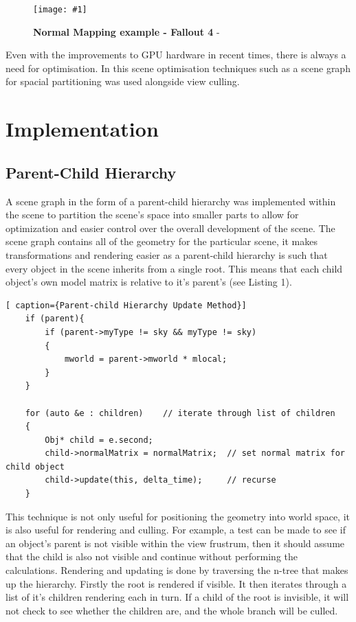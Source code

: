 \documentclass[conference]{acmsiggraph}
\newcommand{\figuremacroW}[4]{
	\begin{figure}[h] %
		\centering
		\texttt{[image: \#1]}
		\caption[#2]{\textbf{#2} - #3}
		\label{fig:#1}
	\end{figure}
}
\begin{document}
\figuremacroW
{fallout}
{Normal Mapping example - Fallout 4}
{\protect\cite{Fallout4}}
{1.0}

Even with the improvements to GPU hardware in recent times, there is always a need for optimisation. In this scene optimisation techniques such as a scene graph for spacial partitioning was used alongside view culling.

\section{Implementation}

\subsection{Parent-Child Hierarchy}

A scene graph in the form of a parent-child hierarchy was implemented within the scene to partition the scene's space into smaller parts to allow for optimization and easier control over the overall development of the scene. The scene graph contains all of the geometry for the particular scene, it makes transformations and rendering easier as a parent-child hierarchy is such that every object in the scene inherits from a single root. This means that each child object's own model matrix is relative to it's parent's (see Listing 1).

\begin{lstlisting}[ caption={Parent-child Hierarchy Update Method}]
 	if (parent){
		if (parent->myType != sky && myType != sky)
		{
			mworld = parent->mworld * mlocal;
		}
	}

	for (auto &e : children)    // iterate through list of children
	{
		Obj* child = e.second;
		child->normalMatrix = normalMatrix;  // set normal matrix for child object 
		child->update(this, delta_time);     // recurse
	}
\end{lstlisting}

This technique is not only useful for positioning the geometry into world space, it is also useful for rendering and culling. For example, a test can be made to see if an object's parent is not visible within the view frustrum, then it should assume that the child is also not visible and continue without performing the calculations.
Rendering and updating is done by traversing the n-tree that makes up the hierarchy. Firstly the root is rendered if visible. It then iterates through a list of it's children rendering each in turn. If a child of the root is invisible, it will not check to see whether the children are, and the whole branch will be culled. 
\end{document}
